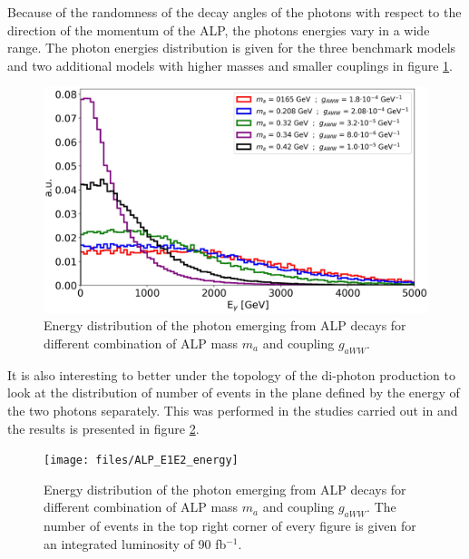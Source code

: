 		Because of the randomness of the decay angles of the photons with respect to the direction of the momentum of the ALP, the photons energies vary in a wide range. The photon energies distribution is given for the three benchmark models and two additional models with higher masses and smaller couplings in figure \ref{im:ALP_photon_energy}. 
		\begin{figure}[h]
			\centering
			\includegraphics[width=0.8\linewidth]{files/ALP_photon_energy}
			\caption{Energy distribution of the photon emerging from ALP decays for different combination of ALP mass $m_a$ and coupling $g_{aWW}$.}
			\label{im:ALP_photon_energy}
		\end{figure}
		
		It is also interesting to better under the topology of the di-photon production to look at the distribution of number of events in the plane defined by the energy of the two photons separately. This was performed in the studies carried out in \cite{Moretti_MasterThesis} and the results is presented in figure \ref{im:ALP_E1E2_distribution}.
		\begin{figure}[h]
			\centering
			\texttt{[image: files/ALP\_E1E2\_energy]}
			\caption{Energy distribution of the photon emerging from ALP decays for different combination of ALP mass $m_a$ and coupling $g_{aWW}$. The number of events in the top right corner of every figure is given for an integrated luminosity of 90 fb$^{-1}$.}
			\label{im:ALP_E1E2_distribution}
		\end{figure}
		
